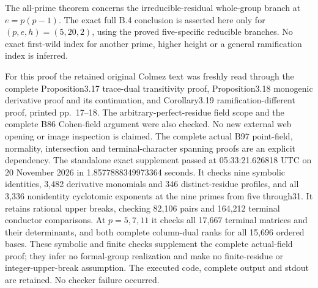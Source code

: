 \begin{remark}
\label{rem:B-RD98-scope}
The all-prime theorem concerns the irreducible-residual
whole-group branch at $e=p(p-1)$. The exact full B.4 conclusion
is asserted here only for $(p,e,h)=(5,20,2)$, using the proved
five-specific reducible branches. No exact first-wild index for
another prime, higher height or a general ramification index
is inferred.

For this proof the retained original Colmez text was freshly
read through the complete Proposition3.17 trace-dual transitivity
proof, Proposition3.18 monogenic derivative proof and its
continuation, and Corollary3.19 ramification-different proof,
printed pp.~17--18. The arbitrary-perfect-residue field scope
and the complete B86 Cohen-field argument were also checked.
No new external web opening or image inspection is claimed.
The complete actual B97 point-field, normality, intersection
and terminal-character spanning proofs are an explicit dependency.
The standalone exact supplement
passed at 05:33:21.626818 UTC on 20 November 2026 in
1.8577888349973364 seconds. It checks nine symbolic identities,
3,482 derivative monomials and 346 distinct-residue profiles,
and all 3,336 nonidentity cyclotomic exponents at the nine primes
from five through31. It retains rational upper breaks, checking
82,106 pairs and 164,212 terminal conductor comparisons. At
$p=5,7,11$ it checks all 17,667 terminal matrices and their
determinants, and both complete column-dual ranks for all 15,696
ordered bases. These symbolic and finite checks supplement the
complete actual-field proof; they infer no formal-group realization
and make no finite-residue or integer-upper-break assumption.
The executed code, complete output and stdout are retained.
No checker failure occurred.
\end{remark}
